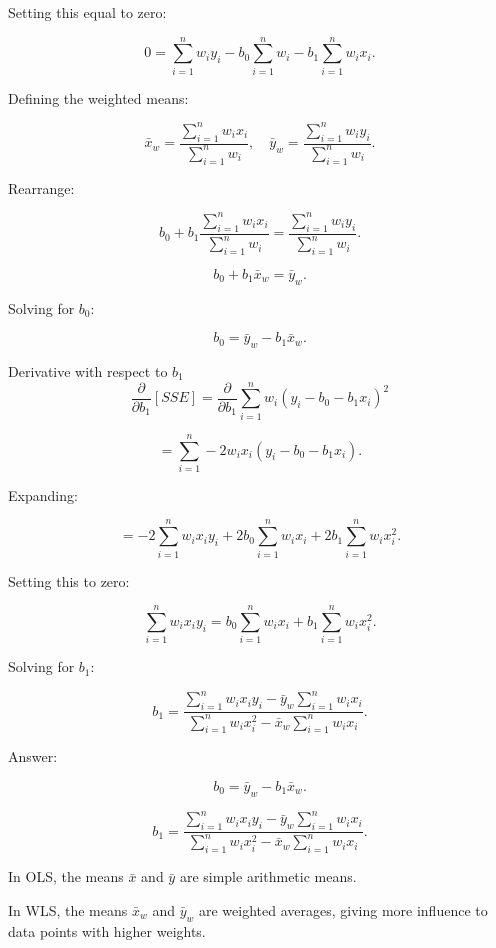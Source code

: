 \documentclass[12pt]{article}
\begin{document}
\begin{enumerate}
Setting this equal to zero:

\[
0 = \sum_{i=1}^{n} w_i y_i - b_0 \sum_{i=1}^{n} w_i - b_1 \sum_{i=1}^{n} w_i x_i.
\]

Defining the weighted means:

\[
\bar{x}_w = \frac{\sum_{i=1}^{n} w_i x_i}{\sum_{i=1}^{n} w_i}, \quad
\bar{y}_w = \frac{\sum_{i=1}^{n} w_i y_i}{\sum_{i=1}^{n} w_i}.
\]

Rearrange:

\[
b_0 + b_1 \frac{\sum_{i=1}^{n} w_i x_i}{\sum_{i=1}^{n} w_i} = \frac{\sum_{i=1}^{n} w_i y_i}{\sum_{i=1}^{n} w_i}.
\]

\[
b_0 + b_1 \bar{x}_w = \bar{y}_w.
\]

Solving for \( b_0 \):

\[
b_0 = \bar{y}_w - b_1 \bar{x}_w.
\]

Derivative with respect to \( b_1 \)
\[
\frac{\partial}{\partial b_1} [SSE] = \frac{\partial}{\partial b_1} \sum_{i=1}^{n} w_i (y_i - b_0 - b_1 x_i)^2
\]

\[
= \sum_{i=1}^{n} -2 w_i x_i (y_i - b_0 - b_1 x_i).
\]

Expanding:

\[
= -2 \sum_{i=1}^{n} w_i x_i y_i + 2 b_0 \sum_{i=1}^{n} w_i x_i + 2 b_1 \sum_{i=1}^{n} w_i x_i^2.
\]

Setting this to zero:

\[
\sum_{i=1}^{n} w_i x_i y_i = b_0 \sum_{i=1}^{n} w_i x_i + b_1 \sum_{i=1}^{n} w_i x_i^2.
\]

Solving for \( b_1 \):

\[
b_1 = \frac{\sum_{i=1}^{n} w_i x_i y_i - \bar{y}_w \sum_{i=1}^{n} w_i x_i}{\sum_{i=1}^{n} w_i x_i^2 - \bar{x}_w \sum_{i=1}^{n} w_i x_i}.
\]

Answer:
 
\[
b_0 = \bar{y}_w - b_1 \bar{x}_w.
\]

\[
b_1 = \frac{\sum_{i=1}^{n} w_i x_i y_i - \bar{y}_w \sum_{i=1}^{n} w_i x_i}{\sum_{i=1}^{n} w_i x_i^2 - \bar{x}_w \sum_{i=1}^{n} w_i x_i}.
\]



In OLS, the means \( \bar{x} \) and \( \bar{y} \) are simple arithmetic means.

In WLS, the means \( \bar{x}_w \) and \( \bar{y}_w \) are weighted averages, giving more influence to data points with higher weights.


\end{enumerate}
\end{document}
